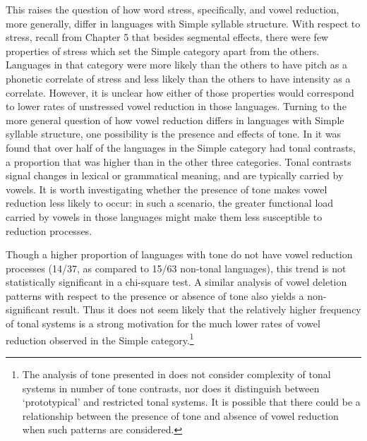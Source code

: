   This raises the question of how word stress, specifically, and vowel reduction, more generally, differ in languages with Simple syllable structure. With respect to stress, recall from Chapter 5 that besides segmental effects, there were few properties of stress which set the Simple category apart from the others. Languages in that category were more likely than the others to have pitch as a phonetic correlate of stress and less likely than the others to have intensity as a correlate. However, it is unclear how either of those properties would correspond to lower rates of unstressed vowel reduction in those languages. Turning to the more general question of how vowel reduction differs in languages with Simple syllable structure, one possibility is the presence and effects of tone. In  it was found that over half of the languages in the Simple category had tonal contrasts, a proportion that was higher than in the other three categories. Tonal contrasts signal changes in lexical or grammatical meaning, and are typically carried by vowels. It is worth investigating whether the presence of tone makes vowel reduction less likely to occur: in such a scenario, the greater functional load carried by vowels in those languages might make them less susceptible to reduction processes.

  Though a higher proportion of languages with tone do not have vowel reduction processes (14/37, as compared to 15/63 non-tonal languages), this trend is not statistically significant in a chi-square test. A similar analysis of vowel deletion patterns with respect to the presence or absence of tone also yields a non-significant result. Thus it does not seem likely that the relatively higher frequency of tonal systems is a strong motivation for the much lower rates of vowel reduction observed in the Simple category.\footnote{ \textrm{The analysis of tone presented in  does not consider complexity of tonal systems in number of tone contrasts,  nor does it distinguish between ‘prototypical’ and restricted tonal systems. It is possible that there could be a relationship between the presence of tone and absence of vowel reduction when such patterns are considered.}}

